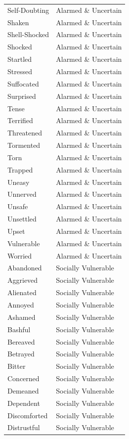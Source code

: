 \begin{longtable}{p{}p{}}
Self-Doubting & Alarmed \& Uncertain \\
Shaken & Alarmed \& Uncertain \\
Shell-Shocked & Alarmed \& Uncertain \\
Shocked & Alarmed \& Uncertain \\
Startled & Alarmed \& Uncertain \\
Stressed & Alarmed \& Uncertain \\
Suffocated & Alarmed \& Uncertain \\
Surprised & Alarmed \& Uncertain \\
Tense & Alarmed \& Uncertain \\
Terrified & Alarmed \& Uncertain \\
Threatened & Alarmed \& Uncertain \\
Tormented & Alarmed \& Uncertain \\
Torn & Alarmed \& Uncertain \\
Trapped & Alarmed \& Uncertain \\
Uneasy & Alarmed \& Uncertain \\
Unnerved & Alarmed \& Uncertain \\
Unsafe & Alarmed \& Uncertain \\
Unsettled & Alarmed \& Uncertain \\
Upset & Alarmed \& Uncertain \\
Vulnerable & Alarmed \& Uncertain \\
Worried & Alarmed \& Uncertain \\
Abandoned & Socially Vulnerable \\
Aggrieved & Socially Vulnerable \\
Alienated & Socially Vulnerable \\
Annoyed & Socially Vulnerable \\
Ashamed & Socially Vulnerable \\
Bashful & Socially Vulnerable \\
Bereaved & Socially Vulnerable \\
Betrayed & Socially Vulnerable \\
Bitter & Socially Vulnerable \\
Concerned & Socially Vulnerable \\
Demeaned & Socially Vulnerable \\
Dependent & Socially Vulnerable \\
Discomforted & Socially Vulnerable \\
Distrustful & Socially Vulnerable \\

\end{longtable}
